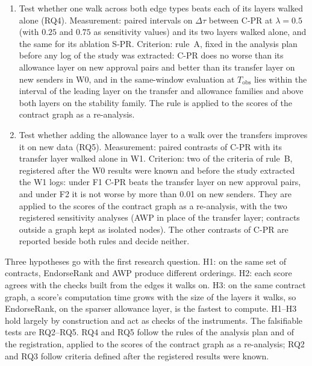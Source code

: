 \begin{enumerate}
\item[O4.] Test whether one walk across both edge types beats each of its layers walked alone (RQ4). Measurement: paired intervals on $\Delta\tau$ between \mbox{C-PR} at $\lambda=0.5$ (with $0.25$ and $0.75$ as sensitivity values) and its two layers walked alone, and the same for its ablation \mbox{S-PR}. Criterion: rule~A, fixed in the analysis plan before any log of the study was extracted: \mbox{C-PR} does no worse than its allowance layer on new approval pairs and better than its transfer layer on new senders in W0, and in the same-window evaluation at $T_{\mathrm{obs}}$ lies within the interval of the leading layer on the transfer and allowance families and above both layers on the stability family. The rule is applied to the scores of the contract graph as a re-analysis.
\item[O5.] Test whether adding the allowance layer to a walk over the transfers improves it on new data (RQ5). Measurement: paired contrasts of \mbox{C-PR} with its transfer layer walked alone in W1. Criterion: two of the criteria of rule~B, registered after the W0 results were known and before the study extracted the W1 logs: under F1 \mbox{C-PR} beats the transfer layer on new approval pairs, and under F2 it is not worse by more than 0.01 on new senders. They are applied to the scores of the contract graph as a re-analysis, with the two registered sensitivity analyses (AWP in place of the transfer layer; contracts outside a graph kept as isolated nodes). The other contrasts of \mbox{C-PR} are reported beside both rules and decide neither.
\end{enumerate}


Three hypotheses go with the first research question. H1: on the same set of contracts, EndorseRank and AWP produce different orderings. H2: each score agrees with the checks built from the edges it walks on. H3: on the same contract graph, a score's computation time grows with the size of the layers it walks, so EndorseRank, on the sparser allowance layer, is the fastest to compute. H1--H3 hold largely by construction and act as checks of the instruments. The falsifiable tests are RQ2--RQ5. RQ4 and RQ5 follow the rules of the analysis plan and of the registration, applied to the scores of the contract graph as a re-analysis; RQ2 and RQ3 follow criteria defined after the registered results were known.

